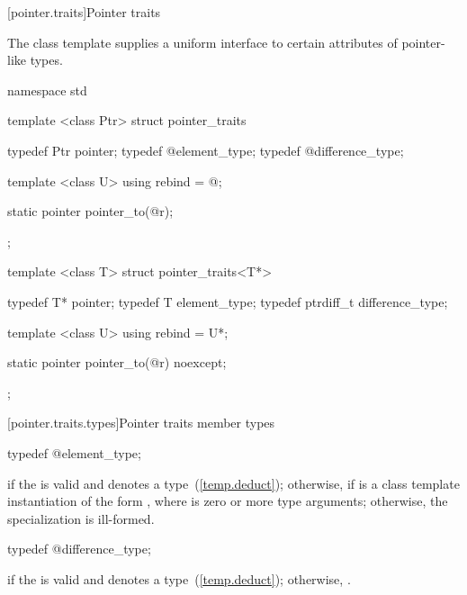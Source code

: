 [pointer.traits]{Pointer traits}

\pnum
The class template  supplies a uniform interface to certain
attributes of pointer-like types.

%
\begin{codeblock}
namespace std {
  template <class Ptr> struct pointer_traits {
    typedef Ptr       pointer;
    typedef @\seebelow@ element_type;
    typedef @\seebelow@ difference_type;

    template <class U> using rebind = @\seebelow@;

    static pointer pointer_to(@\seebelow@ r);
  };

  template <class T> struct pointer_traits<T*> {
    typedef T*        pointer;
    typedef T         element_type;
    typedef ptrdiff_t difference_type;

    template <class U> using rebind = U*;

    static pointer pointer_to(@\seebelow@ r) noexcept;
  };
}
\end{codeblock}

[pointer.traits.types]{Pointer traits member types}

%
%
\begin{itemdecl}
typedef @\seebelow@ element_type;
\end{itemdecl}

\begin{itemdescr}
\pnum
\ctype {} if
the   is valid and denotes a
type~(\ref{temp.deduct}); otherwise,  if
 is a class template instantiation of the form ,
where  is zero or more type arguments; otherwise, the specialization is
ill-formed.
\end{itemdescr}

%
%
\begin{itemdecl}
typedef @\seebelow@ difference_type;
\end{itemdecl}

\begin{itemdescr}
\pnum
\ctype {} if
the   is valid and denotes a
type~(\ref{temp.deduct}); otherwise,
.
\end{itemdescr}

